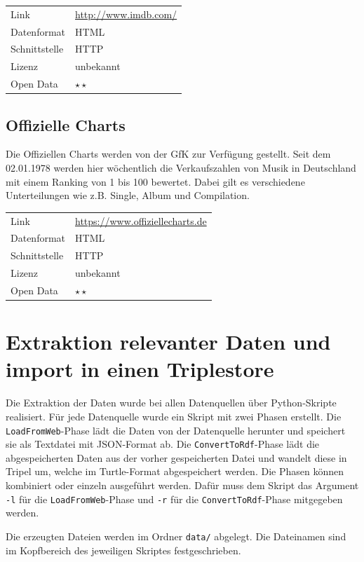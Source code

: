 \documentclass[parskip]{scrartcl}
\begin{document}
\begin{tabular}{l|p{9cm}}
	Link & \url{http://www.imdb.com/} \\
 	Datenformat & HTML \\
 	Schnittstelle & HTTP \\
 	Lizenz & unbekannt \\
 	Open Data & $\star\star$ \\
\end{tabular}

\subsection{Offizielle Charts}

Die Offiziellen Charts werden von der GfK zur Verfügung gestellt. Seit dem 02.01.1978 werden hier wöchentlich die Verkaufszahlen von Musik in Deutschland mit einem Ranking von 1 bis 100 bewertet. Dabei gilt es verschiedene Unterteilungen wie z.B. Single, Album und Compilation.

\begin{tabular}{l|p{9cm}}
    Link & \url{https://www.offiziellecharts.de} \\
    Datenformat & HTML \\
    Schnittstelle & HTTP \\
    Lizenz & unbekannt \\
    Open Data & $\star\star$ \\
\end{tabular}

\section{Extraktion relevanter Daten und import in einen Triplestore }

Die Extraktion der Daten wurde bei allen Datenquellen über Python-Skripte realisiert. Für jede Datenquelle wurde ein Skript mit zwei Phasen erstellt. Die \texttt{LoadFromWeb}-Phase lädt die Daten von der Datenquelle herunter und speichert sie als Textdatei mit JSON-Format ab. Die \texttt{ConvertToRdf}-Phase lädt die abgespeicherten Daten aus der vorher gespeicherten Datei und wandelt diese in Tripel um, welche im Turtle-Format abgespeichert werden. Die Phasen können kombiniert oder einzeln ausgeführt werden. Dafür muss dem Skript das Argument \texttt{-l} für die \texttt{LoadFromWeb}-Phase und \texttt{-r} für die \texttt{ConvertToRdf}-Phase mitgegeben werden.

Die erzeugten Dateien werden im Ordner \texttt{data/} abgelegt. Die Dateinamen sind im Kopfbereich des jeweiligen Skriptes festgeschrieben.
\end{document}
